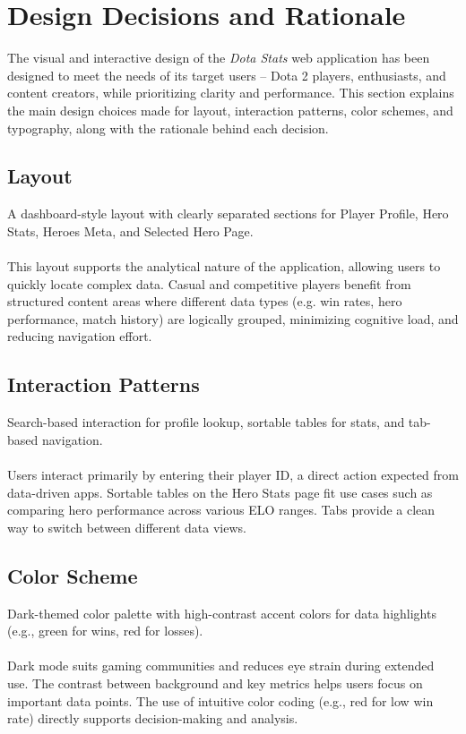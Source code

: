 \documentclass{article}
\begin{document}
\section{Design Decisions and Rationale}

The visual and interactive design of the \textit{Dota Stats} web application has been designed to meet the needs of its target users -- Dota 2 players, enthusiasts, and content creators, while prioritizing clarity and performance. This section explains the main design choices made for layout, interaction patterns, color schemes, and typography, along with the rationale behind each decision.

\subsection{Layout}

A dashboard-style layout with clearly separated sections for Player Profile, Hero Stats, Heroes Meta, and Selected Hero Page.
\\
\\
This layout supports the analytical nature of the application, allowing users to quickly locate complex data. Casual and competitive players benefit from structured content areas where different data types (e.g. win rates, hero performance, match history) are logically grouped, minimizing cognitive load, and reducing navigation effort.

\subsection{Interaction Patterns}

Search-based interaction for profile lookup, sortable tables for stats, and tab-based navigation.
\\
\\
Users interact primarily by entering their player ID, a direct action expected from data-driven apps. Sortable tables on the Hero Stats page fit use cases such as comparing hero performance across various ELO ranges. Tabs provide a clean way to switch between different data views.

\subsection{Color Scheme}

Dark-themed color palette with high-contrast accent colors for data highlights (e.g., green for wins, red for losses).
\\
\\
Dark mode suits gaming communities and reduces eye strain during extended use. The contrast between background and key metrics helps users focus on important data points. The use of intuitive color coding (e.g., red for low win rate) directly supports decision-making and analysis.
\end{document}
